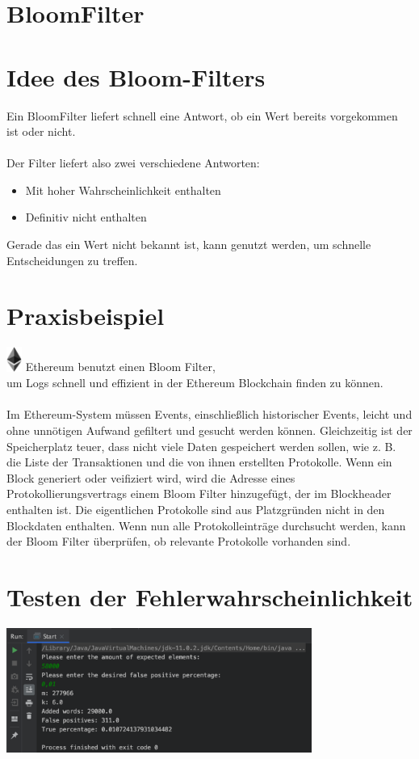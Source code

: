 \documentclass[11pt, a4paper]{article}
\begin{document}
\section*{BloomFilter}


\section{Idee des Bloom-Filters}
Ein BloomFilter liefert schnell eine Antwort, ob ein Wert bereits vorgekommen ist oder nicht. \\\\
Der Filter liefert also zwei verschiedene Antworten:
\begin{itemize}  
	\item Mit hoher Wahrscheinlichkeit enthalten
	\item Definitiv nicht enthalten
\end{itemize}
Gerade das ein Wert nicht bekannt ist, kann genutzt werden, um schnelle Entscheidungen zu treffen.\\

\section{Praxisbeispiel}
\includegraphics[height=8mm]{image/Ethereum.png}
Ethereum benutzt einen Bloom Filter,\\ um Logs schnell und effizient in der Ethereum Blockchain finden zu können. \\
\\
Im Ethereum-System müssen Events, einschließlich historischer Events, leicht und ohne unnötigen Aufwand gefiltert und gesucht werden können. Gleichzeitig ist der Speicherplatz teuer, dass nicht viele Daten gespeichert werden sollen, wie z. B. die Liste der Transaktionen und die von ihnen erstellten Protokolle.
Wenn ein Block generiert oder veifiziert wird, wird die Adresse eines Protokollierungsvertrags einem Bloom Filter hinzugefügt, der im Blockheader enthalten ist. Die eigentlichen Protokolle sind aus Platzgründen nicht in den Blockdaten enthalten.
Wenn nun alle Protokolleinträge durchsucht werden, kann der Bloom Filter überprüfen, ob relevante Protokolle vorhanden sind.

\section{Testen der Fehlerwahrscheinlichkeit}


\includegraphics[width=10cm]{image/Result.png}
\end{document}
